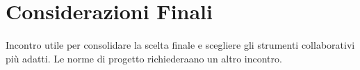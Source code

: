 \section{Considerazioni Finali}

\paragraph{}
Incontro utile per consolidare la scelta finale e
scegliere gli strumenti collaborativi più adatti.
Le norme di progetto richiederaano un altro incontro.